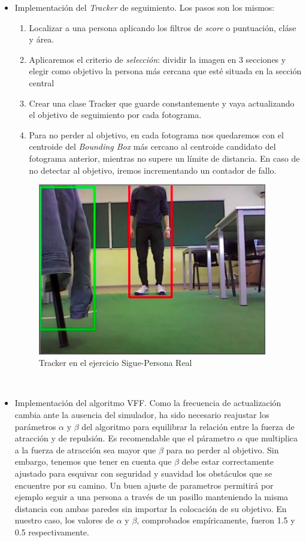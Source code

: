 \begin{itemize}
	\item Implementación del \textit{Tracker} de seguimiento. Los pasos son los mismos:
	\begin{enumerate}
		\item Localizar a una persona aplicando los filtros de \textit{score} o puntuación, cláse y área.
		\item Aplicaremos el criterio de \textit{selección}: dividir la imagen en 3 secciones y elegir como objetivo la persona más cercana que esté situada en la sección central
		\item Crear una clase Tracker que guarde constantemente y vaya actualizando el objetivo de seguimiento por cada fotograma.
		\item Para no perder al objetivo, en cada fotograma nos quedaremos con el centroide del \textit{Bounding Box} más cercano al centroide candidato del fotograma anterior, mientras no supere un límite de distancia. En caso de no detectar al objetivo, iremos incrementando un contador de fallo.
	\end{enumerate}
	\begin{figure} [H]
		\begin{center}
			\includegraphics[width=10cm]{imagenes/cap6/tracker.png}
		\end{center}
		\caption[Tracker en el ejercicio Sigue-Persona Real]{Tracker en el ejercicio Sigue-Persona Real}
		\label{fig:tracker_real_follow_person}
	\end{figure}\
	
	\item Implementación del algoritmo VFF. Como la frecuencia de actualización cambia ante la ausencia del simulador, ha sido necesario reajustar los parámetros $\alpha$ y $\beta$ del algoritmo para equilibrar la relación entre la fuerza de atracción y de repulsión. Es recomendable que el párametro $\alpha$ que multiplica a la fuerza de atracción sea mayor que $\beta$ para no perder al objetivo. Sin embargo, tenemos que tener en cuenta que $\beta$ debe estar correctamente ajustado para esquivar con seguridad y suavidad los obstáculos que se encuentre por su camino. Un buen ajuste de parametros permitirá por ejemplo seguir a una persona a través de un pasillo manteniendo la misma distancia con ambas paredes sin importar la colocación de su objetivo. En nuestro caso, los valores de $\alpha$ y $\beta$, comprobados empíricamente, fueron 1.5 y 0.5 respectivamente.
	

\end{itemize}
